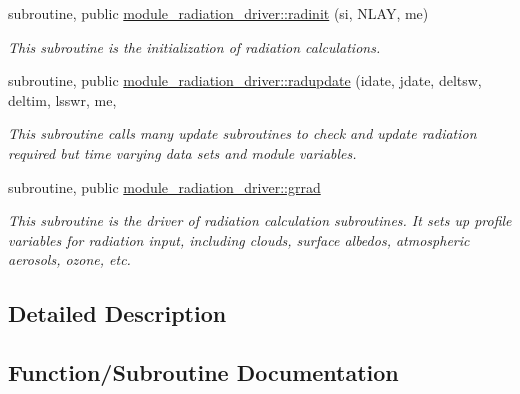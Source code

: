 \begin{DoxyCompactItemize}
\item 
subroutine, public \hyperlink{group__module__radiation__driver_ga866dcd42f95b3e7df6b448833fe7c33b}{module\+\_\+radiation\+\_\+driver\+::radinit} (si, N\+L\+AY, me)
\begin{DoxyCompactList}\small\item\em This subroutine is the initialization of radiation calculations. \end{DoxyCompactList}\end{DoxyCompactItemize}
\begin{DoxyCompactItemize}
\item 
subroutine, public \hyperlink{group__module__radiation__driver_gab34c4eb6e32fd200a6385ae70c5dab12}{module\+\_\+radiation\+\_\+driver\+::radupdate} (idate, jdate, deltsw, deltim, lsswr, me,
\begin{DoxyCompactList}\small\item\em This subroutine calls many update subroutines to check and update radiation required but time varying data sets and module variables. \end{DoxyCompactList}\end{DoxyCompactItemize}
\begin{DoxyCompactItemize}
\item 
subroutine, public \hyperlink{group__module__radiation__driver_ga955c841d2ffda6975007d94101b79f7a}{module\+\_\+radiation\+\_\+driver\+::grrad}
\begin{DoxyCompactList}\small\item\em This subroutine is the driver of radiation calculation subroutines. It sets up profile variables for radiation input, including clouds, surface albedos, atmospheric aerosols, ozone, etc. \end{DoxyCompactList}\end{DoxyCompactItemize}


\subsection{Detailed Description}


\subsection{Function/\+Subroutine Documentation}
